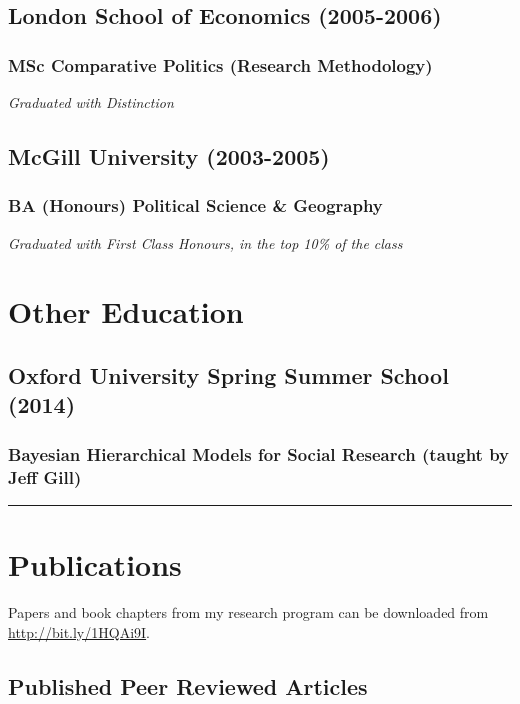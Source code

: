 \documentclass[a4paper]{article}
\begin{document}
\subsection*{London School of Economics (2005-2006)}
\subsubsection*{MSc Comparative Politics (Research Methodology)}

{\emph{Graduated with Distinction}}

\subsection*{McGill University (2003-2005)}
\subsubsection*{BA (Honours) Political Science \& Geography}

{\emph{Graduated with First Class Honours, in the top 10\% of the class}}

\section*{Other Education}

\subsection*{Oxford University Spring Summer School (2014)}

\subsubsection*{Bayesian Hierarchical Models for Social Research (taught by Jeff Gill)}

\vspace{0.25cm}
\medskip\hrule height 1pt
\vspace{0.5cm}


\section*{Publications}

\noindent Papers and book chapters from my research program can be downloaded from {\url{http://bit.ly/1HQAi9I}}.

\subsection*{Published Peer Reviewed Articles}
\end{document}
